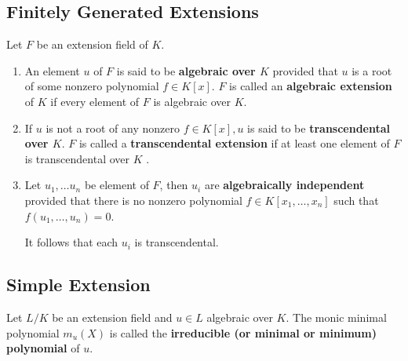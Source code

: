 \subsection{Finitely Generated Extensions}
\begin{definition}
    Let $F$ be an extension field of $K$.
    \begin{enumerate}
        \item
              An element $u$ of $F$ is said to be \textbf{algebraic over $K$} provided that $u$ is a root of some nonzero polynomial $ f  \in  K [ x ]$.
              $F$ is called an \textbf{algebraic extension} of $K$ if every element of $F$ is algebraic over $K$.
        \item

              If $u$ is not a root of any nonzero $ f  \in K[ x ],  u $ is said to be \textbf{transcendental over $K$}.
              $F$ is called a \textbf{transcendental extension} if at least one element of $F$ is transcendental over $K$ .

        \item
              Let $u_1,\ldots u_n$ be element of $F$, then $u_i$ are \textbf{algebraically independent} provided that there is no nonzero polynomial $f\in K\left[x_1,\ldots,x_n\right]$ such that $f\left(u_1,\ldots,u_n\right)=0$.
              \begin{remark}
                  It follows that each $u_i$ is transcendental.
              \end{remark}
    \end{enumerate}
\end{definition}


\subsection{Simple Extension} %
\begin{definition}
    Let $L/K$ be an extension field and $u \in L$ algebraic over $K$.
    The monic minimal polynomial $m_u(X)$ is called the \textbf{irreducible (or minimal or minimum) polynomial} of $u$.
\end{definition}

